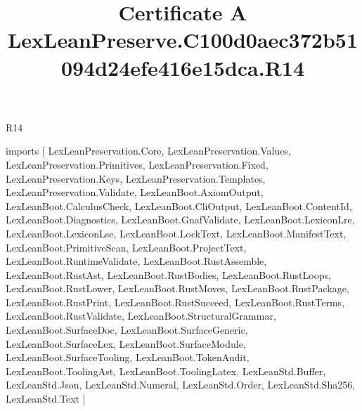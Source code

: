\begin{lexlean}{R14}
\title{Certificate A LexLeanPreserve.C100d0aec372b51094d24efe416e15dca.R14}
\begin{coremodule}
imports [
  LexLeanPreservation.Core,
  LexLeanPreservation.Values,
  LexLeanPreservation.Primitives,
  LexLeanPreservation.Fixed,
  LexLeanPreservation.Keys,
  LexLeanPreservation.Templates,
  LexLeanPreservation.Validate,
  LexLeanBoot.AxiomOutput,
  LexLeanBoot.CalculusCheck,
  LexLeanBoot.CliOutput,
  LexLeanBoot.ContentId,
  LexLeanBoot.Diagnostics,
  LexLeanBoot.GnafValidate,
  LexLeanBoot.LexiconLre,
  LexLeanBoot.LexiconLse,
  LexLeanBoot.LockText,
  LexLeanBoot.ManifestText,
  LexLeanBoot.PrimitiveScan,
  LexLeanBoot.ProjectText,
  LexLeanBoot.RuntimeValidate,
  LexLeanBoot.RustAssemble,
  LexLeanBoot.RustAst,
  LexLeanBoot.RustBodies,
  LexLeanBoot.RustLoops,
  LexLeanBoot.RustLower,
  LexLeanBoot.RustMoves,
  LexLeanBoot.RustPackage,
  LexLeanBoot.RustPrint,
  LexLeanBoot.RustSucceed,
  LexLeanBoot.RustTerms,
  LexLeanBoot.RustValidate,
  LexLeanBoot.StructuralGrammar,
  LexLeanBoot.SurfaceDoc,
  LexLeanBoot.SurfaceGeneric,
  LexLeanBoot.SurfaceLex,
  LexLeanBoot.SurfaceModule,
  LexLeanBoot.SurfaceTooling,
  LexLeanBoot.TokenAudit,
  LexLeanBoot.ToolingAst,
  LexLeanBoot.ToolingLatex,
  LexLeanStd.Buffer,
  LexLeanStd.Json,
  LexLeanStd.Numeral,
  LexLeanStd.Order,
  LexLeanStd.Sha256,
  LexLeanStd.Text
]


\end{coremodule}
\end{lexlean}
